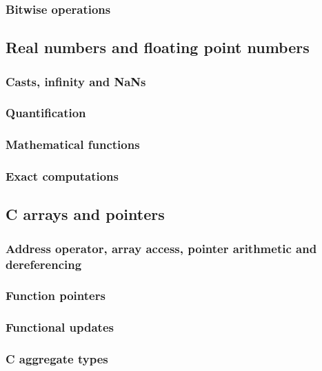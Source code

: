 \subsubsection{Bitwise operations}

\subsection{Real numbers and floating point numbers}

\subsubsection{Casts, infinity and NaNs}

\subsubsection{Quantification}


\subsubsection{Mathematical functions}

\subsubsection{Exact computations}

\subsection{C arrays and pointers}

\subsubsection{Address operator, array access, pointer arithmetic and dereferencing}
\label{sec:address}

\subsubsection{Function pointers}

\subsubsection{Functional updates}


\subsubsection{C aggregate types}


